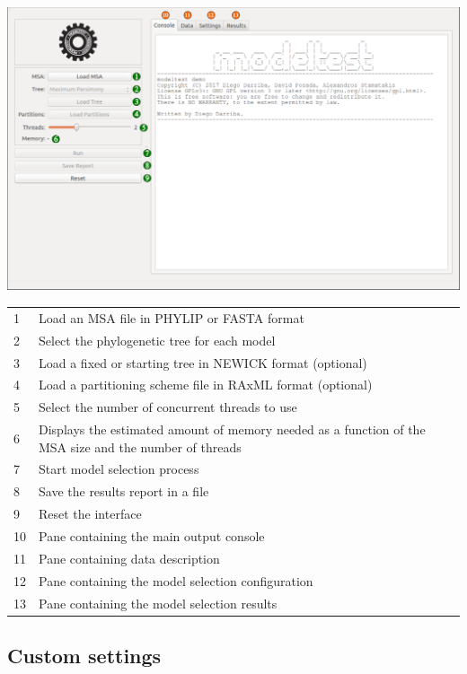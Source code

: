 \documentclass[10pt,twoside,a4paper]{article}
\begin{document}
\begin{center}
\includegraphics[width=.9\textwidth]{images/main-window}
\end{center}

\begin{tabular}{l p{}}
  \color{ForestGreen}1 & Load an MSA file in PHYLIP or FASTA format \\
  \color{ForestGreen}2 & Select the phylogenetic tree for each model \\
  \color{ForestGreen}3 & Load a fixed or starting tree in NEWICK format (optional) \\
  \color{ForestGreen}4 & Load a partitioning scheme file in RAxML format (optional) \\
  \color{ForestGreen}5 & Select the number of concurrent threads to use \\
  \color{ForestGreen}6 & Displays the estimated amount of memory needed as a function of the MSA size and the number of threads \\
  \hline
  \color{ForestGreen}7 & Start model selection process \\
  \color{ForestGreen}8 & Save the results report in a file \\
  \color{ForestGreen}9 & Reset the interface \\
  \hline
  \color{RedOrange}10 & Pane containing the main output console \\
  \color{RedOrange}11 & Pane containing data description \\
  \color{RedOrange}12 & Pane containing the model selection configuration \\
  \color{RedOrange}13 & Pane containing the model selection results \\
\end{tabular}

\subsection{Custom settings}
\end{document}
